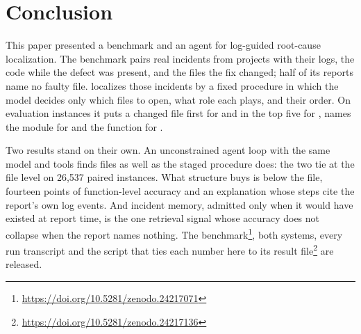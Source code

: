 \section{Conclusion}
\label{sec:conclusion}

This paper presented a benchmark and an agent for log-guided root-cause
localization. The benchmark pairs \nInstances{} real incidents from
\nProjects{} projects with their logs, the code while the defect was
present, and the files the fix changed; half of its reports name
no faulty file. \sys{} localizes those incidents by a fixed
procedure in which the model decides only which files to open, what
role each plays, and their order. On \nEval{} evaluation instances it
puts a changed file first for \accOne{} and in the top five for
\accFive{}, names the module for \modOne{} and the function for
\regOne{}.

Two results stand on their own.
An unconstrained agent loop with the same model and tools finds files
as well as the staged procedure does: the two tie at the file level on
26{,}537 paired instances.
What structure buys is below the file, fourteen points of
function-level accuracy and an explanation whose steps cite the
report's own log events. And incident memory, admitted only when it would have existed at report
time, is the one retrieval signal whose accuracy does not collapse when
the report names nothing. The benchmark\footnote{\url{https://doi.org/10.5281/zenodo.24217071}}, both
systems, every run transcript and the script that ties each number
here to its result file\footnote{\url{https://doi.org/10.5281/zenodo.24217136}}
are released.
